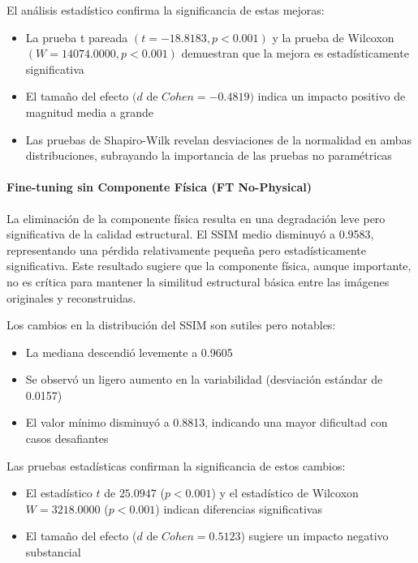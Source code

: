 El análisis estadístico confirma la significancia de estas mejoras:

\begin{itemize}
    \item La prueba t pareada $(t = -18.8183, p < 0.001)$ y la prueba de Wilcoxon $(W = 14074.0000, p < 0.001)$ demuestran que la mejora es estadísticamente significativa
    \item El tamaño del efecto $(d$ de $Cohen = -0.4819)$ indica un impacto positivo de magnitud media a grande
    \item Las pruebas de Shapiro-Wilk revelan desviaciones de la normalidad en ambas distribuciones, subrayando la importancia de las pruebas no paramétricas
\end{itemize}

\paragraph{Fine-tuning sin Componente Física (FT No-Physical)}
La eliminación de la componente física resulta en una degradación leve pero significativa de la calidad estructural. El SSIM medio disminuyó a 0.9583, representando una pérdida relativamente pequeña pero estadísticamente significativa. Este resultado sugiere que la componente física, aunque importante, no es crítica para mantener la similitud estructural básica entre las imágenes originales y reconstruidas.

Los cambios en la distribución del SSIM son sutiles pero notables:

\begin{itemize}
    \item La mediana descendió levemente a 0.9605
    \item Se observó un ligero aumento en la variabilidad (desviación estándar de 0.0157)
    \item El valor mínimo disminuyó a 0.8813, indicando una mayor dificultad con casos desafiantes
\end{itemize}

Las pruebas estadísticas confirman la significancia de estos cambios:

\begin{itemize}
    \item El estadístico $t$ de $25.0947$ ($p < 0.001$) y el estadístico de Wilcoxon $W = 3218.0000$ ($p < 0.001$) indican diferencias significativas
    \item El tamaño del efecto ($d$ de $Cohen = 0.5123$) sugiere un impacto negativo substancial
\end{itemize}

